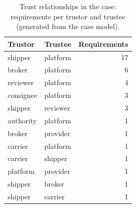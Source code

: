 \begin{table}[t]\centering\small
\caption{Trust relationships in the case: requirements per trustor and trustee (generated from the case model).}\label{tab:relations}
\begin{tabular}{@{}llr@{}}\toprule Trustor & Trustee & Requirements\\\midrule
shipper & platform & 17\\
broker & platform & 6\\
reviewer & platform & 4\\
consignee & platform & 3\\
shipper & reviewer & 3\\
authority & platform & 1\\
broker & provider & 1\\
carrier & platform & 1\\
carrier & shipper & 1\\
platform & provider & 1\\
shipper & broker & 1\\
shipper & carrier & 1\\
\bottomrule\end{tabular}\end{table}%
